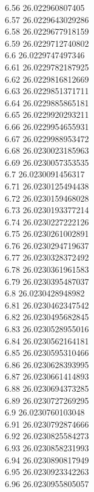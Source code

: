 {6.56	26.022960807405\\
6.57	26.0229643029286\\
6.58	26.0229677918159\\
6.59	26.0229712740802\\
6.6	26.0229747497346\\
6.61	26.0229782187925\\
6.62	26.0229816812669\\
6.63	26.0229851371711\\
6.64	26.0229885865181\\
6.65	26.0229920293211\\
6.66	26.0229954655931\\
6.67	26.0229988953472\\
6.68	26.0230023185963\\
6.69	26.0230057353535\\
6.7	26.0230091456317\\
6.71	26.0230125494438\\
6.72	26.0230159468028\\
6.73	26.0230193377214\\
6.74	26.0230227222126\\
6.75	26.0230261002891\\
6.76	26.0230294719637\\
6.77	26.0230328372492\\
6.78	26.0230361961583\\
6.79	26.0230395487037\\
6.8	26.0230428948982\\
6.81	26.0230462347542\\
6.82	26.0230495682845\\
6.83	26.0230528955016\\
6.84	26.0230562164181\\
6.85	26.0230595310466\\
6.86	26.0230628393995\\
6.87	26.0230661414893\\
6.88	26.0230694373285\\
6.89	26.0230727269295\\
6.9	26.0230760103048\\
6.91	26.0230792874666\\
6.92	26.0230825584273\\
6.93	26.0230858231993\\
6.94	26.0230890817949\\
6.95	26.0230923342263\\
6.96	26.0230955805057\\
}

